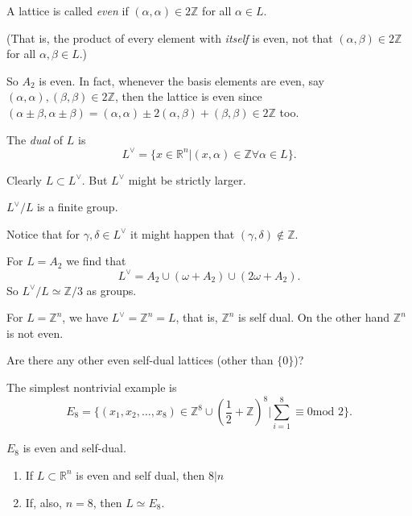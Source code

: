 \begin{definition}
\label{definition-even-lattice}
A lattice is called {\it even} if
$(\alpha,\alpha)\in 2 \mathbb{Z}$
for all $\alpha \in L$.
\end{definition}

\noindent
(That is, the product of every element with
{\it itself} is even,
not that $(\alpha,\beta)\in 2 \mathbb{Z}$ for
all $\alpha,\beta \in L$.)

So $A_2$ is even. In fact, whenever the basis
elements
are even, say
$(\alpha,\alpha),(\beta,\beta)\in
2\mathbb{Z}$,
then the lattice is even since
$(\alpha \pm \beta,\alpha \pm
\beta)=(\alpha,\alpha)
\pm 2(\alpha,\beta)+(\beta,\beta) \in
2\mathbb{Z}$ too.

\begin{definition}
\label{definition-dual-lattice}
The {\it dual} of $L$ is
$$
L^\vee=\{ x \in \mathbb{R}^n|(x,\alpha) \in
\mathbb{Z}\forall \alpha \in L\}.
$$
\end{definition}

\noindent
Clearly $L \subset L^\vee$.
But $L^\vee$ might be strictly larger.

\begin{exercise}
\label{exercise-discriminant}
$L^\vee/L$ is a finite group.
\end{exercise}

\noindent
Notice that for  $\gamma,\delta \in L^\vee$
it might happen that $(\gamma,\delta) \not\in
\mathbb{Z}$.

For $L=A_2$ we find that
$$
L^\vee = A_2 \cup (\omega+A_2) \cup  (2\omega
+ A_2).
$$
So $L^\vee/L \simeq \mathbb{Z}/3$ as groups.

For $L = \mathbb{Z}^n$, we have
$L^\vee=\mathbb{Z}^n=L$, that is,
$\mathbb{Z}^n$ is self dual.
On the other hand $\mathbb{Z}^n$ is not even.

Are there any other even self-dual lattices
(other than $\{0\}$)?

The simplest nontrivial example is
$$
E_8=\{(x_1,x_2,\ldots,x_8) \in \mathbb{Z}^8
\cup (\frac{1}{2}+\mathbb{Z})^8|
\sum_{i=1}^8 \equiv 0 \text{mod }2\}.
$$

\begin{lemma}
\label{lemma-e8}
$E_8$ is even and self-dual.
\end{lemma}

\begin{theorem}
\label{theorem-self-dual-lattices}
\begin{enumerate}
\item If $L \subset \mathbb{R}^n$ is even and
self dual,
then $8|n$

\item If, also, $n=8$, then $L \simeq E_8$.
\end{enumerate}
\end{theorem}

